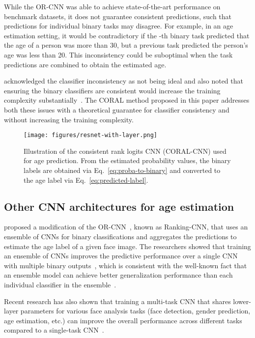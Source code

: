 \documentclass[times,twocolumn,final,authoryear]{elsarticle}
\begin{document}
While the OR-CNN was able to achieve state-of-the-art performance on benchmark datasets, it does not guarantee consistent predictions, such that predictions for individual binary tasks may disagree. For example, in an age estimation setting, it would be contradictory if the -th binary task predicted that the age of a person was more than 30, but a previous task predicted the person's age was less than 20. This inconsistency could be suboptimal when the  task predictions are combined to obtain the estimated age.

\cite{niu2016ordinal} acknowledged the classifier inconsistency as not being ideal and also noted that ensuring the  binary classifiers are consistent would increase the training complexity substantially~\citep{niu2016ordinal}. The CORAL method proposed in this paper addresses both these issues with a theoretical guarantee for classifier consistency and without increasing the training complexity.

\begin{figure*}
\begin{center}
\centerline{\texttt{[image: figures/resnet-with-layer.png]}}
\caption{Illustration of the consistent rank logits CNN (CORAL-CNN) used for age prediction. From the estimated probability values, the binary labels are obtained via Eq.~\ref{eq:proba-to-binary} and converted to the age label via Eq.~\ref{eq:predicted-label}.}
\label{fig:resnet}
\end{center}
\end{figure*}





\subsection{Other CNN architectures for age estimation}

\cite{chen2017using} proposed a modification of the OR-CNN~\citep{niu2016ordinal}, known as Ranking-CNN, that uses an ensemble of CNNs for binary classifications and aggregates the predictions to estimate the age label of a given face image.  The researchers showed that training an ensemble of CNNs improves the predictive performance over a single CNN with multiple binary outputs~\citep{chen2017using}, which is consistent with the well-known fact that an ensemble model can achieve better generalization performance than each individual classifier in the ensemble~\citep{raschka2019pyml3}.

Recent research has also shown that training a multi-task CNN that shares lower-layer parameters for various face analysis tasks (face detection, gender prediction, age estimation, etc.) can improve the overall performance across different tasks compared to a single-task CNN~\citep{ranjan2017all}. 
\end{document}
